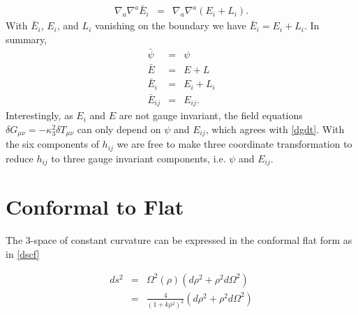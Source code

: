 \documentclass[10pt,letterpaper]{article}
\numberwithin{equation}{section}
\begin{document}
\begin{eqnarray}
\nabla_a\nabla^a \bar E_i &=& \nabla_a\nabla^a(E_i+L_i).
\end{eqnarray}
With $\bar E_i$, $E_i$, and $L_i$ vanishing on the boundary we have $\bar E_i = E_i + L_i$. In summary,
\begin{eqnarray}
\bar \psi &=& \psi
\nonumber\\
\bar E &=& E+L
\nonumber\\
\bar E_i &=& E_i + L_i
\nonumber\\
\bar E_{ij} &=& E_{ij}.
\end{eqnarray}
Interestingly, as $E_i$ and $E$ are not gauge invariant, the field equations $\delta G_{\mu\nu} = -\kappa^2_3 \delta T_{\mu\nu}$ can only depend on $\psi$ and $E_{ij}$, which agrees with \eqref{dgdt}. With the six components of $h_{ij}$ we are free to make three coordinate transformation to reduce $h_{ij}$ to three gauge invariant components, i.e. $\psi$ and $E_{ij}$. 



\section{Conformal to Flat}

The 3-space of constant curvature can be expressed in the conformal flat form as in \eqref{dscf}

\begin{eqnarray}
ds^2 &=& \Omega^2(\rho)\left( d\rho^2 + \rho^2 d\Omega^2\right)
\nonumber\\
&=& \frac{4}{\left(1+k \rho^2\right)^2}\left( d\rho^2 + \rho^2 d\Omega^2\right)
\label{cfbg}
\end{eqnarray}
\end{document}
